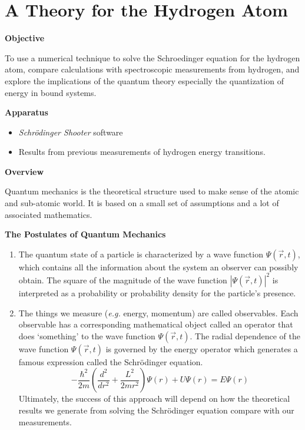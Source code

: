 \section{A Theory for the Hydrogen Atom}

\makelabheader %

\textbf{Objective}

To use a numerical technique to solve the Schroedinger equation for the hydrogen atom,
compare calculations with spectroscopic measurements from hydrogen,
 and explore
the implications of the quantum theory especially the quantization of energy
in bound systems.

\textbf{Apparatus}

\begin{itemize}

\item {\it Schr\"odinger Shooter} software

\item Results from previous measurements of hydrogen energy transitions.

\end{itemize}

\textbf{Overview}

Quantum mechanics is the theoretical structure used to make sense of the atomic and sub-atomic
world. 
It is based on a small set of assumptions and a lot of associated mathematics.

\begin{center}
\bf The Postulates of Quantum Mechanics
\end{center}

\begin{enumerate}

\item The quantum state of a particle is characterized by a wave function  
$\Psi(\vec r,t)$, which contains all the information about the system an observer can 
possibly obtain.
The square of the magnitude of the wave function $|\Psi (\vec r,t)|^2$ 
is interpreted as a probability or probability density for the particle's presence. 

\item The things we measure ({\it e.g.} energy, momentum) are called observables. 
Each observable has a corresponding mathematical object called an operator 
that does `something' to the wave function $\Psi(\vec r,t)$.
The radial dependence of the wave function $\Psi(\vec r,t)$ is governed by
the energy operator which generates a famous expression called the
Schr\"odinger equation.
\begin{equation}
-\frac{\hbar^2}{2 m}\left ( \frac{d^2}{d r^2} +  
   \frac{L^2}{2 m r^2} \right ) \Psi(r) + U \Psi(r) = E  \Psi(r)
\end{equation}
Ultimately, the success of this approach will depend on how the theoretical
results we generate from solving the Schr\"odinger equation compare with
our measurements.

\end{enumerate}

